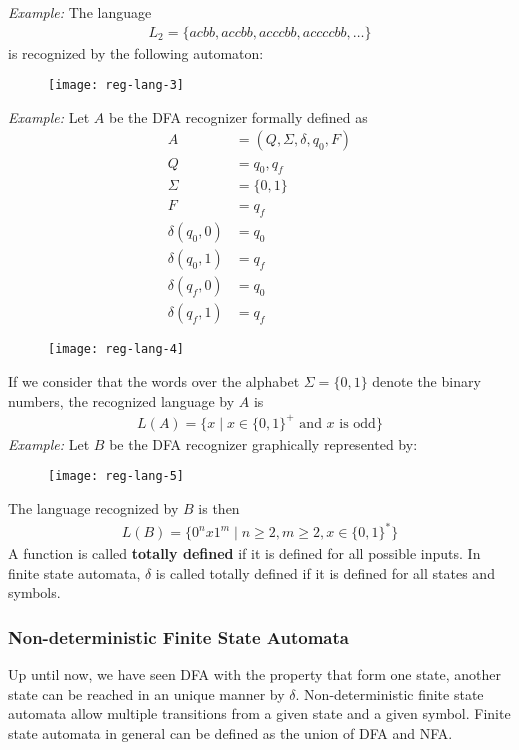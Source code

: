 \textit{Example:} The language 
\begin{align*}
  L_2 = \{ acbb, accbb, acccbb, accccbb, \dots \}
\end{align*}
is recognized by the following automaton:
\begin{figure}[H]
  \centering
  \texttt{[image: reg-lang-3]}
\end{figure}
\textit{Example:} Let $A$ be the DFA recognizer formally defined as
\begin{align*}
  A & = (Q, \Sigma, \delta, q_0, F)\\
  Q & = {q_0, q_f}\\
  \Sigma & = \{ 0,1 \}\\
  F & = {q_f}\\
  \delta(q_0, 0) & = q_0\\
  \delta(q_0, 1) & = q_f\\
  \delta(q_f, 0) & = q_0\\
  \delta(q_f, 1) & = q_f
\end{align*}
\begin{figure}[H]
  \centering
  \texttt{[image: reg-lang-4]}
\end{figure}
If we consider that the words over the alphabet $\Sigma = \{0,1\}$ denote
the binary numbers, the recognized language by $A$ is 
\begin{align*}
  L(A) = \{ x \mid x \in \{0,1\}^{+} \text{ and $x$ is odd}\}
\end{align*}
\textit{Example:} Let $B$ be the DFA recognizer graphically represented by:
\begin{figure}[H]
  \centering
  \texttt{[image: reg-lang-5]}
\end{figure}
The language recognized by $B$ is then
\begin{align*}
  L(B) = \{ 0^{n}x1^{m} \mid n \geq 2, m \geq 2, x \in \{0,1\}^{*}\}
\end{align*}
A function is called \textbf{totally defined} if it is 
defined for all possible inputs. In finite state automata, 
$\delta$ is called totally defined if it is defined for all states
and symbols.
\subsubsection{Non-deterministic Finite State Automata}
Up until now, we have seen DFA with the property
that form one state, another state can be reached in an unique manner
by $\delta$. Non-deterministic finite state automata allow multiple 
transitions from a given state and a given symbol. Finite state automata
in general can be defined as the union of DFA and NFA.\\

